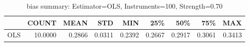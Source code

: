 \begin{table}[ht]
\centering
\caption{bias summary: Estimator=OLS, Instruments=100, Strength=0.70}
\begin{tabular}{lrrrrrrrr}
\toprule
 & COUNT & MEAN & STD & MIN & 25\% & 50\% & 75\% & MAX \\
\midrule
OLS & 10.0000 & 0.2866 & 0.0311 & 0.2392 & 0.2667 & 0.2917 & 0.3061 & 0.3413 \\
\bottomrule
\end{tabular}
\end{table}
